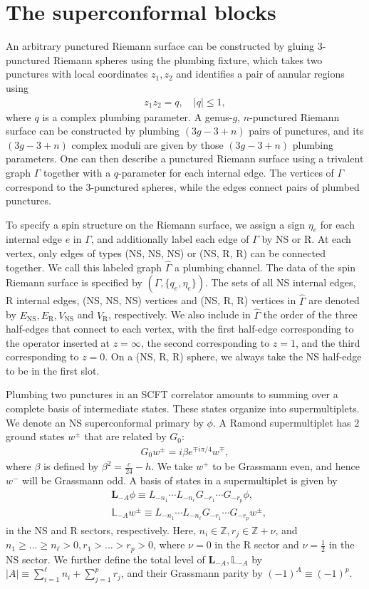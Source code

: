 \documentclass[aps,10pt,twocolumn,superscriptaddress]{revtex4-2}
\def\ie{\begin{equation}\begin{aligned}}
\def\fe{\end{aligned}\end{equation}}
\def\NS{\mathrm{NS}}
\def\R{\mathrm{R}}
\begin{document}
\section{The superconformal blocks}

\label{sec:scblock}

An arbitrary punctured Riemann surface can be constructed by gluing 3-punctured Riemann spheres using the plumbing fixture, which takes two punctures with local coordinates $z_1, z_2$ and identifies a pair of annular regions using
\ie 
z_1z_2=q,\quad |q|\leq 1,
\fe
where $q$ is a complex plumbing parameter. A genus-$g$, $n$-punctured Riemann surface can be constructed by plumbing $(3g-3+n)$ pairs of punctures, and its $(3g-3+n)$ complex moduli are given by those $(3g-3+n)$ plumbing parameters. One can then describe a punctured Riemann surface using a trivalent graph $\Gamma$ together with a $q$-parameter for each internal edge. The vertices of $\Gamma$ correspond to the 3-punctured spheres, while the edges connect pairs of plumbed punctures. 

To specify a spin structure on the Riemann surface, we assign a sign $\eta_e$ for each internal edge $e$ in $\Gamma$, and additionally label each edge of $\Gamma$ by NS or R. At each vertex, only edges of types (NS, NS, NS) or (NS, R, R) can be connected together. We call this labeled graph $\hat{\Gamma}$ a plumbing channel. The data of the spin Riemann surface is specified by $(\hat{\Gamma}, \{q_e, \eta_e\})$. The sets of all NS internal edges, R internal edges, (NS, NS, NS) vertices and (NS, R, R) vertices in $\hat{\Gamma}$ are denoted by $E_{\NS}, E_{\R}, V_{\NS}$ and $V_{\R}$, respectively. We also include in $\hat{\Gamma}$ the order of the three half-edges that connect to each vertex, with the first half-edge corresponding to the operator inserted at $z=\infty$, the second corresponding to $z=1$, and the third corresponding to $z=0$. On a (NS, R, R) sphere, we always take the NS half-edge to be in the first slot.

Plumbing two punctures in an SCFT correlator amounts to summing over a complete basis of intermediate states. These states organize into supermultiplets. We denote an NS superconformal primary by $\phi$. A Ramond supermultiplet has 2 ground states $w^\pm$ that are related by $G_0$:
\ie
G_0 w^\pm = i \beta e^{\mp i\pi/4} w^\mp,
\fe
where $\beta$ is defined by $\beta^2 = \frac{c}{24}-h$. We take $w^+$ to be Grassmann even, and hence $w^-$ will be Grassmann odd. A basis of states in a supermultiplet is given by 
\ie
&\mathbf{L}_{-A}\phi \equiv L_{-n_1}\cdots L_{-n_\ell} G_{-r_1}\cdots G_{-r_p} \phi,\\
&\mathbb{L}_{-A} w^\pm \equiv L_{-n_1}\cdots L_{-n_\ell} G_{-r_1}\cdots G_{-r_p} w^\pm,
\fe
in the NS and R sectors, respectively. Here, $n_i\in \mathbb{Z}, r_j\in \mathbb{Z}+\nu$, and $n_1 \geq ... \geq n_\ell>0, r_1>...>r_p>0$, where $\nu=0$ in the R sector and $\nu=\frac{1}{2}$ in the NS sector. We further define the total level of $\mathbf{L}_{-A}, \mathbb{L}_{-A}$ by $|A|\equiv \sum_{i=1}^\ell n_i + \sum_{j=1}^{p} r_j$, and their Grassmann parity by $(-1)^A \equiv (-1)^{p}$.  
\end{document}
